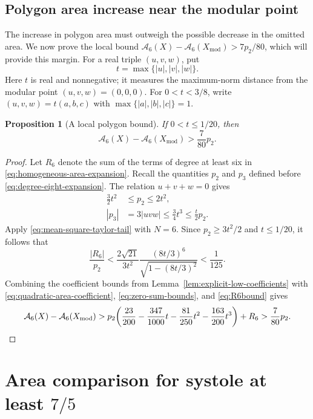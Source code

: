 \documentclass[10pt,twoside]{article}
\theoremstyle{plain}
\newtheorem{proposition}[theorem]{Proposition}
\theoremstyle{definition}
\theoremstyle{remark}
\newcommand{\A}{\mathcal A}
\newcommand{\Xmod}{X_{\mathrm{mod}}}
\begin{document}
\subsection{Polygon area increase near the modular point}
\label{sec:analytic-local-region}
The increase in polygon area must outweigh the possible decrease
in the omitted area. We now prove the local bound
$\A_6(X)-\A_6(\Xmod)>7p_2/80$, which will provide this margin.
For a real triple $(u,v,w)$, put
\begin{equation}\label{eq:t}
    t=\max\{|u|,|v|,|w|\}.
\end{equation}
Here $t$ is real and nonnegative; it measures the maximum-norm
distance from the modular point $(u,v,w)=(0,0,0)$.
For $0<t<3/8$, write
$(u,v,w)=t(a,b,c)$ with $\max\{|a|,|b|,|c|\}=1$.

\begin{proposition}[A local polygon bound]
\label{prop:uniform-p6}
If $0<t\leq1/20$, then
$$
\A_6(X)-\A_6(\Xmod)>\frac7{80}p_2.
$$
\end{proposition}
\begin{proof}
Let $R_6$ denote the sum of the terms of degree at least six in
\eqref{eq:homogeneous-area-expansion}.
Recall the quantities $p_2$ and $p_3$ defined before
\eqref{eq:degree-eight-expansion}. The relation $u+v+w=0$ gives
\begin{equation}
\label{eq:zero-sum-bounds}
\begin{aligned}
\frac32t^2&\leq p_2\leq2t^2,\\
|p_3|&=3|uvw|\leq\frac34t^3
\leq\frac{t}{2}p_2.
\end{aligned}
\end{equation}
Apply \eqref{eq:mean-square-taylor-tail} with $N=6$.
Since $p_2\geq3t^2/2$ and $t\leq1/20$, it follows that
\begin{equation}\label{eq:R6bound}
    \frac{|R_6|}{p_2}
<\frac{2\sqrt{21}}{3t^2}
\frac{(8t/3)^6}{\sqrt{1-(8t/3)^2}}
<\frac1{125}.
\end{equation}
Combining the coefficient bounds from
Lemma~\ref{lem:explicit-low-coefficients} with
\eqref{eq:quadratic-area-coefficient}, \eqref{eq:zero-sum-bounds},
and \eqref{eq:R6bound} gives
\begin{equation*}
\A_6(X)-\A_6(\Xmod)
>p_2\biggl(\frac{23}{200}-\frac{347}{1000}t-\frac{81}{250}t^2
-\frac{163}{200}t^3\biggr)+R_6
>\frac7{80}p_2.
\qedhere
\end{equation*}
\end{proof}
\section{Area comparison for systole at least \texorpdfstring{$7/5$}{7/5}}
\label{sec:large-systole}
\end{document}
